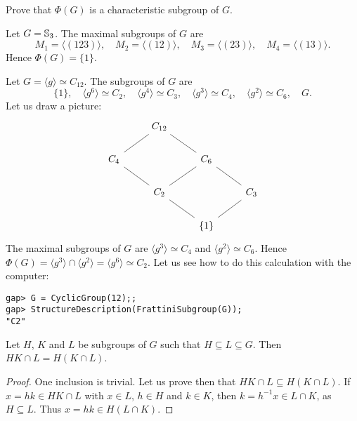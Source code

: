 \begin{exercise}
\label{xca:Phi(G)char}
Prove that $\Phi(G)$ is a characteristic subgroup of $G$. 
\end{exercise}

\begin{example}
Let $G=\mathbb{S}_3$. The maximal subgroups of $G$ are 
\[
M_1=\langle (123)\rangle,
\quad
M_2=\langle (12)\rangle,
\quad
M_3=\langle (23)\rangle,
\quad
M_4=\langle (13)\rangle.
\]
Hence $\Phi(G)=\{1\}$. 
\end{example}

\begin{example}
Let $G=\langle g\rangle\simeq C_{12}$. The subgroups of $G$ are 
\[
\{1\},\quad
\langle g^6\rangle\simeq C_2,\quad
\langle g^4\rangle\simeq C_3,\quad
\langle g^3\rangle\simeq C_4,\quad
\langle g^2\rangle\simeq C_6,\quad
G.
\]
Let us draw a picture:
\[\begin{tikzcd}
	& {C_{12}} \\
	{C_4} && {C_6} \\
	& {C_2} && {C_3} \\
	&& {\{1\}}
	\arrow[no head, from=4-3, to=3-2]
	\arrow[no head, from=4-3, to=3-4]
	\arrow[no head, from=3-4, to=2-3]
	\arrow[no head, from=2-3, to=1-2]
	\arrow[no head, from=3-2, to=2-1]
	\arrow[no head, from=2-1, to=1-2]
	\arrow[no head, from=3-2, to=2-3]
\end{tikzcd}\]
The maximal subgroups of $G$ are 
$\langle g^3\rangle\simeq C_4$ and $\langle
g^2\rangle\simeq C_6$. Hence $\Phi(G)=\langle g^3\rangle\cap \langle
g^2\rangle=\langle g^6\rangle\simeq C_2$. 
Let us see how to do this calculation with the computer:
\begin{lstlisting}
gap> G = CyclicGroup(12);;
gap> StructureDescription(FrattiniSubgroup(G));
"C2"
\end{lstlisting} 
\end{example}

\begin{lemma}[Dedekind]
\label{lem:Dedekind}
Let $H$, $K$ and $L$ be subgroups of $G$ 
such that $H\subseteq L\subseteq G$. Then 
$HK\cap L=H(K\cap L)$.
\end{lemma}

\begin{proof}
One inclusion is trivial. Let us prove then that 
$HK\cap L\subseteq H(K\cap L)$. If 
$x=hk\in HK\cap L$ with $x\in L$, $h\in H$ and $k\in K$, then 
$k=h^{-1}x\in L\cap K$, as $H\subseteq L$. Thus $x=hk\in H(L\cap
	K)$.
\end{proof}


